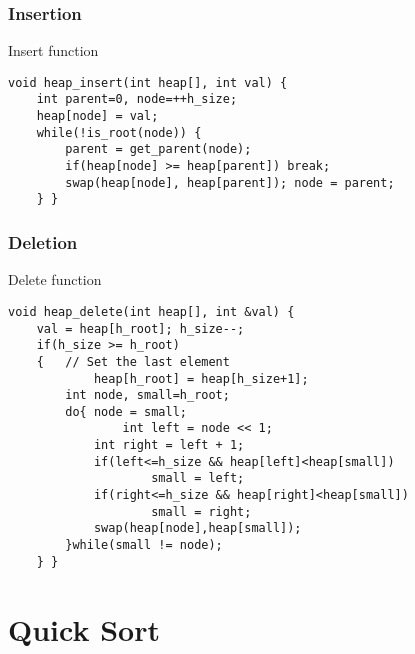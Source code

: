 \documentclass{beamer}
\begin{document}
\begin{frame}[fragile]

\frametitle{Insertion}

\begin{block}{Insert function}
\begin{lstlisting}
void heap_insert(int heap[], int val) {
    int parent=0, node=++h_size;
    heap[node] = val;
    while(!is_root(node)) {
        parent = get_parent(node);
        if(heap[node] >= heap[parent]) break;
        swap(heap[node], heap[parent]); node = parent;
 	} }
\end{lstlisting}
\end{block}
\end{frame}

\begin{frame}[fragile]
\frametitle{Deletion}
\begin{block}{Delete function}
\begin{lstlisting}
void heap_delete(int heap[], int &val) {
    val = heap[h_root]; h_size--;
    if(h_size >= h_root)
    {   // Set the last element
        	heap[h_root] = heap[h_size+1];
        int node, small=h_root;
        do{	node = small;
            	int left = node << 1;
            int right = left + 1;
            if(left<=h_size && heap[left]<heap[small])
                	small = left;
            if(right<=h_size && heap[right]<heap[small])
                	small = right;
            swap(heap[node],heap[small]);
        }while(small != node);
    } }
\end{lstlisting}
\end{block}

\end{frame}

\section{Quick Sort}
\end{document}
